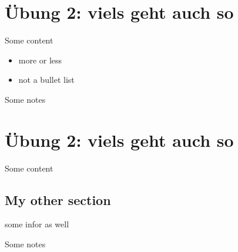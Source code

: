 \documentclass[
  a4paper,
,tablecaptionabove
]{scrartcl}
\providecommand{\tightlist}{%
  \setlength{\itemsep}{0pt}\setlength{\parskip}{0pt}}
\begin{document}
\hypertarget{uxfcbung-2-viels-geht-auch-so}{%
\section{Übung 2: viels geht auch
so}\label{uxfcbung-2-viels-geht-auch-so}}

Some content

\begin{itemize}
\tightlist
\item
  more or less
\item
  not a bullet list
\end{itemize}

Some notes

\hypertarget{uxfcbung-2-viels-geht-auch-so-1}{%
\section{Übung 2: viels geht auch
so}\label{uxfcbung-2-viels-geht-auch-so-1}}

Some content

\hypertarget{my-other-section}{%
\subsection{My other section}\label{my-other-section}}

some infor as well

Some notes
\end{document}

